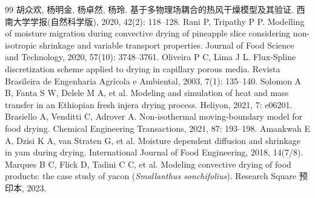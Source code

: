 \documentclass[withoutpreface,bwprint]{cumcmthesis} %
\begin{document}
\begin{thebibliography}{99}%
\small%
    胡众欢, 杨明金, 杨卓然, 杨玲.
    \newblock 基于多物理场耦合的热风干燥模型及其验证\allowbreak[J].
    \newblock 西南大学学报(自然科学版), 2020, 42(2): 118--128.
    Rani P, Tripathy P P.
    \newblock Modelling of moisture migration during convective drying of pineapple slice considering non-isotropic shrinkage and variable transport properties\allowbreak[J].
    \newblock Journal of Food Science and Technology, 2020, 57(10): 3748--3761.
    Oliveira P C, Lima J L.
    \newblock Flux-Spline discretization scheme applied to drying in capillary porous media\allowbreak[J].
    \newblock Revista Brasileira de Engenharia Agr\'icola e Ambiental, 2003, 7(1): 135--140.
    Solomon A B, Fanta S W, Delele M A, et al.
    \newblock Modeling and simulation of heat and mass transfer in an Ethiopian fresh injera drying process\allowbreak[J].
    \newblock Heliyon, 2021, 7: e06201.
    Brasiello A, Venditti C, Adrover A.
    \newblock Non-isothermal moving-boundary model for food drying\allowbreak[J].
    \newblock Chemical Engineering Transactions, 2021, 87: 193--198.
    Amankwah E A, Dzisi K A, van Straten G, et al.
    \newblock Moisture dependent diffusion and shrinkage in yam during drying\allowbreak[J].
    \newblock International Journal of Food Engineering, 2018, 14(7/8).
    Marques B C, Flick D, Tadini C C, et al.
    \newblock Modeling convective drying of food products: the case study of yacon (\textit{Smallanthus sonchifolius})\allowbreak[R].
    \newblock Research Square 预印本, 2023.


\end{thebibliography}
\end{document}
